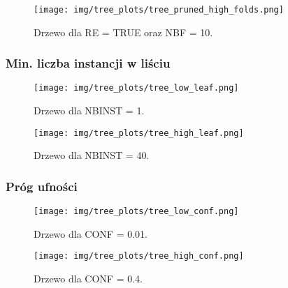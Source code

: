   \begin{figure}[H]
    \center
    \texttt{[image: img/tree\_plots/tree\_pruned\_high\_folds.png]}
    \caption{Drzewo dla RE = TRUE oraz NBF = 10.}
  \end{figure}


  \subsubsection*{Min. liczba instancji w liściu}
  \begin{figure}[H]
    \center
    \texttt{[image: img/tree\_plots/tree\_low\_leaf.png]}
    \caption{Drzewo dla NBINST = 1.}
  \end{figure}

  \begin{figure}[H]
    \center
    \texttt{[image: img/tree\_plots/tree\_high\_leaf.png]}
    \caption{Drzewo dla NBINST = 40.}
  \end{figure}
 

  \subsubsection*{Próg ufności}
  \begin{figure}[H]
    \center
    \texttt{[image: img/tree\_plots/tree\_low\_conf.png]}
    \caption{Drzewo dla CONF = 0.01.}
  \end{figure}

  \begin{figure}[H]
    \center
    \texttt{[image: img/tree\_plots/tree\_high\_conf.png]}
    \caption{Drzewo dla CONF = 0.4.}
  \end{figure}
